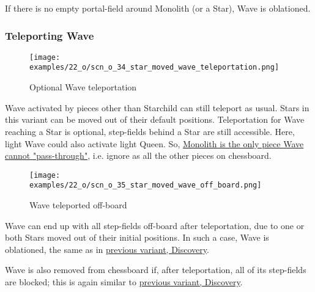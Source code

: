 If there is no empty portal-field around Monolith (or a Star), Wave is oblationed.

\clearpage %

\subsubsection*{Teleporting Wave}
\label{sec:One/Starchild/Activating Wave/Teleporting Wave}

\vspace*{-0.9\baselineskip}
\noindent
\begin{figure}[!h]
\texttt{[image: examples/22\_o/scn\_o\_34\_star\_moved\_wave\_teleportation.png]}
\caption{Optional Wave teleportation}
\label{fig:scn_o_34_star_moved_wave_teleportation}
\end{figure}

\vspace*{-0.3\baselineskip}
Wave activated by pieces other than Starchild can still teleport as usual. Stars
in this variant can be moved out of their default positions. Teleportation for
Wave reaching a Star is optional, step-fields behind a Star are still accessible.
Here, light Wave could also activate light Queen. So,
\hyperref[fig:scn_d_14_teleport_wave_via_monolith]{Monolith is the only piece Wave cannot "pass-through"},
i.e. ignore as all the other pieces on chessboard.

\clearpage %

\vspace*{-2.1\baselineskip}
\noindent
\begin{figure}[!h]
\texttt{[image: examples/22\_o/scn\_o\_35\_star\_moved\_wave\_off\_board.png]}
\caption{Wave teleported off-board}
\label{fig:scn_o_35_star_moved_wave_off_board}
\end{figure}

Wave can end up with all step-fields off-board after teleportation, due to one or
both Stars moved out of their initial positions. In such a case, Wave is oblationed,
the same as in
\hyperref[fig:scn_d_16_wave_teleported_off_board]{previous variant, Discovery}.

Wave is also removed from chessboard if, after teleportation, all of its step-fields
are blocked; this is again similar to
\hyperref[fig:scn_d_15_teleported_wave_blocked]{previous variant, Discovery}.

